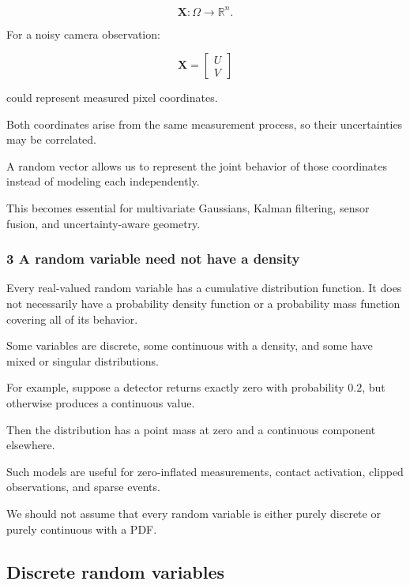 \[
 \mathbf X:\Omega\rightarrow\mathbb R^n.
\]

For a noisy camera observation:

\[
 \mathbf X= \begin{bmatrix} U\\V \end{bmatrix}
\]

could represent measured pixel coordinates.

Both coordinates arise from the same measurement process, so their uncertainties may be correlated.

A random vector allows us to represent the joint behavior of those coordinates instead of modeling each independently.

This becomes essential for multivariate Gaussians, Kalman filtering, sensor fusion, and uncertainty-aware geometry.

\subsubsection{3 A random variable need not have a density}\label{02-foundations-ii-ch023-a-random-variable-need-not-have-a-density}

\hypertarget{02-foundations-ii-ch023-a-random-variable-need-not-have-a-density}{}

Every real-valued random variable has a cumulative distribution function. It does not necessarily have a probability density function or a probability mass function covering all of its behavior.

Some variables are discrete, some continuous with a density, and some have mixed or singular distributions.

For example, suppose a detector returns exactly zero with probability \(0.2\), but otherwise produces a continuous value.

Then the distribution has a point mass at zero and a continuous component elsewhere.

Such models are useful for zero-inflated measurements, contact activation, clipped observations, and sparse events.

We should not assume that every random variable is either purely discrete or purely continuous with a PDF.

\subsection{Discrete random variables}\label{02-foundations-ii-ch023-discrete-random-variables}

